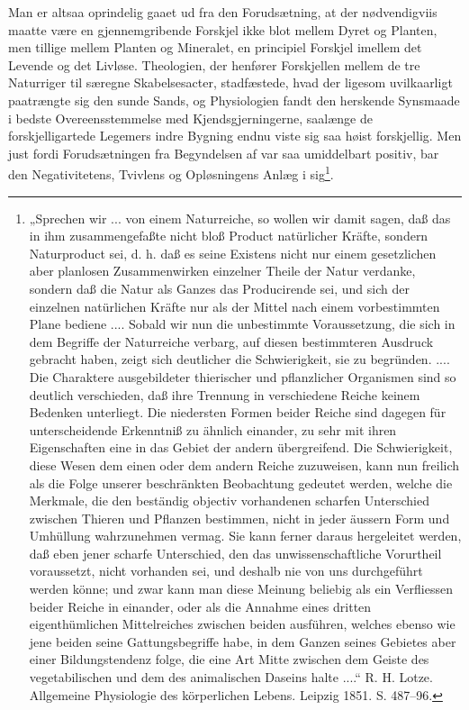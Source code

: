 \documentclass[12pt,a4paper]{book}
\begin{document}
\setcounter{footnote}{0}
Man er altsaa oprindelig gaaet ud fra den Forudsætning, at der
nødvendigviis maatte være en gjennemgribende Forskjel ikke blot mellem
Dyret og Planten, men tillige mellem Planten og Mineralet, en principiel
Forskjel imellem det Levende og det Livløse. Theologien, der henfører
Forskjellen mellem de tre Naturriger til særegne Skabelsesacter,
stadfæstede, hvad der ligesom uvilkaarligt paatrængte sig den sunde Sands,
og Physiologien fandt den herskende Synsmaade i bedste Overeensstemmelse
med Kjendsgjerningerne, saalænge de forskjelligartede Legemers indre
Bygning endnu viste sig saa høist forskjellig. Men just fordi
Forudsætningen fra Begyndelsen af var saa umiddelbart positiv, bar den
Negativitetens, Tvivlens og Opløsningens Anlæg i
sig\footnote{„Sprechen wir ... von einem Naturreiche, so wollen wir damit
sagen, daß das in ihm zusammengefaßte nicht bloß Product natürlicher
Kräfte, sondern Naturproduct sei, d. h. daß es seine Existens nicht nur
einem gesetzlichen aber planlosen Zusammenwirken einzelner Theile der
Natur verdanke, sondern daß die Natur als Ganzes das Producirende sei, und
sich der einzelnen natürlichen Kräfte nur als der Mittel nach einem
vorbestimmten Plane bediene .... Sobald wir nun die unbestimmte
Voraussetzung, die sich in dem Begriffe der Naturreiche verbarg, auf
diesen bestimmteren Ausdruck gebracht haben, zeigt sich deutlicher die
Schwierigkeit, sie zu begründen. .... Die Charaktere ausgebildeter
thierischer und pflanzlicher Organismen sind so deutlich verschieden, daß
ihre Trennung in verschiedene Reiche keinem Bedenken unterliegt. Die
niedersten Formen beider Reiche sind dagegen für unterscheidende
Erkenntniß zu ähnlich einander, zu sehr mit ihren Eigenschaften eine in
das Gebiet der andern übergreifend. Die Schwierigkeit, diese Wesen dem
einen oder dem andern Reiche zuzuweisen, kann nun freilich als die Folge
unserer beschränkten Beobachtung gedeutet werden, welche die Merkmale,
die den beständig objectiv vorhandenen scharfen Unterschied zwischen
Thieren und Pflanzen bestimmen, nicht in jeder äussern Form und Umhüllung
wahrzunehmen vermag. Sie kann ferner daraus hergeleitet werden, daß eben
jener scharfe Unterschied, den das unwissenschaftliche Vorurtheil
voraussetzt, nicht vorhanden sei, und deshalb nie von uns durchgeführt
werden könne; und zwar kann man diese Meinung beliebig als ein
Verfliessen beider Reiche in einander, oder als die Annahme eines dritten
eigenthümlichen Mittelreiches zwischen beiden ausführen, welches ebenso
wie jene beiden seine Gattungsbegriffe habe, in dem Ganzen seines Gebietes
aber einer Bildungstendenz folge, die eine Art Mitte zwischen dem Geiste
des vegetabilischen und dem des animalischen Daseins halte ....“ R. H.
Lotze. Allgemeine Physiologie des körperlichen Lebens. Leipzig 1851. S.
487--96.}.
\end{document}
